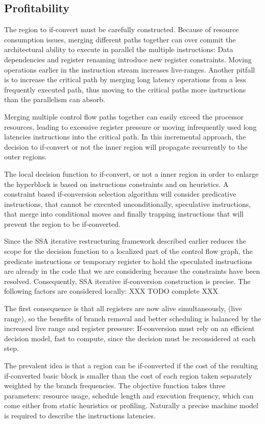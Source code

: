 \subsection{Profitability}

The region to if-convert must be carefully constructed. Because of resource consumption issues, merging different paths together can over commit the architectural ability to execute in parallel the multiple instructions: Data dependencies and register renaming introduce new register constraints. Moving operations earlier in the instruction stream increases live-ranges. 
Another pitfall is to increase the critical path by merging long latency operations from a less frequently executed path, thus moving to the critical paths more instructions than the parallelism can absorb.

Merging multiple control flow paths together can easily exceed the processor resources, leading to excessive register pressure or moving infrequently used long latencies instructions into the critical path. In this incremental approach, the decision to if-convert or not the inner region will propagate recurrently to the outer regions.

The local decision function to if-convert, or not a inner region in order to enlarge the hyperblock is based on instructions constraints and on heuristics.
A constraint based if-conversion selection algorithm will consider predicative instructions, that cannot be executed unconditionally, speculative instructions, that merge into conditional moves and finally trapping instructions that will prevent the region to be if-converted. 

Since the SSA iterative restructuring framework described earlier reduces the scope for the decision function to a localized part of the control flow graph, the predicate instructions or temporary register to hold the speculated instructions are already in the code that we are considering because the constraints have been resolved. Consequently, SSA iterative if-conversion construction is precise. The following factors are considered locally: XXX TODO complete XXX

The first consequence is that all registers are now alive simultaneously, (live range), so the benefits of branch removal and better scheduling is balanced by the increased live range and register pressure: If-conversion must rely on an efficient decision model, fast to compute, since the decision must be reconsidered at each step.

The prevalent idea is that a region can be if-converted if the cost of the resulting if-converted basic block is smaller than the cost of each region taken separately weighted by the branch frequencies. The objective function takes three parameters: resource usage, schedule length and execution frequency, which can come either from static heuristics or profiling. Naturally a precise machine model is required to describe the instructions latencies.

